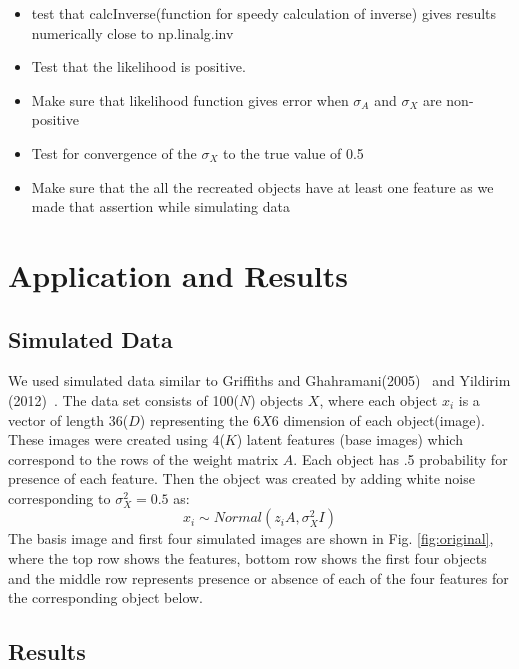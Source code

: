 \documentclass{article}
\begin{document}
\begin{itemize}
\item{test that calcInverse(function for speedy calculation of inverse) gives results numerically close to np.linalg.inv}
\item{Test that the likelihood is positive.}
\item{Make sure that likelihood function gives error when $\sigma_A$ and $\sigma_X$ are non-positive}
\item{Test for convergence of the $\sigma_X$ to the true value of 0.5}
\item{Make sure that the all the recreated objects have at least one feature as we made that assertion while simulating data}
\end{itemize}

\section{Application and Results}
\subsection{Simulated Data}
We used simulated data similar to Griffiths and Ghahramani(2005)~\cite{griffiths} and Yildirim (2012)~\cite{yildirim}. The data set consists of 100($N$) objects $X$, where each object $x_i$ is a vector of length 36($D$) representing the $6X6$ dimension of each object(image). These images were created using 4($K$) latent features (base images) which correspond to the rows of the weight matrix $A$. Each object has .5 probability for presence of each feature. Then the object was created by adding white noise corresponding to $\sigma_X^2=0.5$ as:
\[
x_i \sim Normal(z_iA, \sigma_X^2I)
\]
The basis image and first four simulated images are shown in Fig. \ref{fig:original}, where the top row shows the features, bottom row shows the first four objects and the middle row represents presence or absence of each of the four features for the corresponding object below.\\

\subsection{Results}
\end{document}
